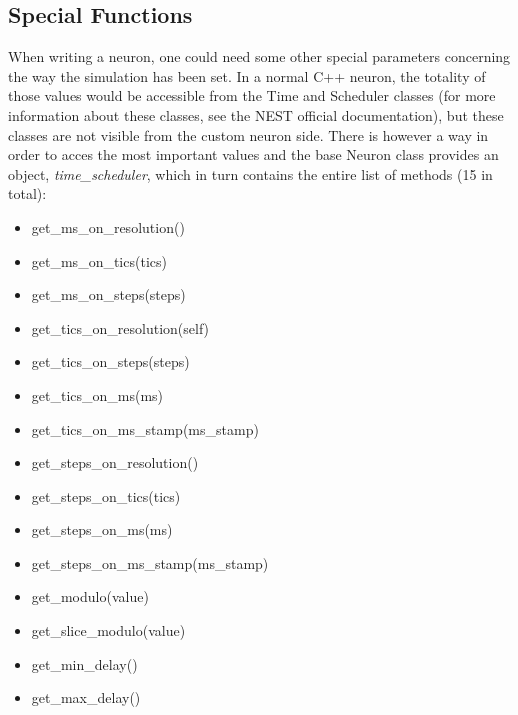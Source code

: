 \documentclass{article}
\begin{document}
\subsection{Special Functions}
When writing a neuron, one could need some other special parameters concerning the way the simulation has been set. In a normal C++ neuron, the totality of those values would be accessible from the Time and Scheduler classes (for more information about these classes, see the NEST official documentation), but these classes are not visible from the custom neuron side. 
There is however a way in order to acces the most important values and the base Neuron class provides an object, \emph{time\_scheduler}, which in turn contains the entire list of methods (15 in total):
\begin{itemize}
\item get\_ms\_on\_resolution()

\item get\_ms\_on\_tics(tics)

\item get\_ms\_on\_steps(steps)

\item get\_tics\_on\_resolution(self)

\item get\_tics\_on\_steps(steps)

\item get\_tics\_on\_ms(ms)
   
\item get\_tics\_on\_ms\_stamp(ms\_stamp)

\item get\_steps\_on\_resolution()

\item get\_steps\_on\_tics(tics)

\item get\_steps\_on\_ms(ms)

\item get\_steps\_on\_ms\_stamp(ms\_stamp)

\item get\_modulo(value)

\item get\_slice\_modulo(value)

\item get\_min\_delay()

\item get\_max\_delay()

\end{itemize}
\end{document}
